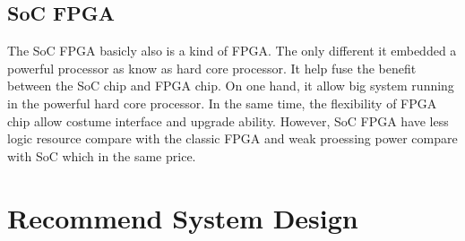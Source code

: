 \documentclass[12pt,article]{memoir}
\begin{document}
\section{SoC FPGA}
The SoC FPGA basicly also is a kind of FPGA. The only different it embedded a powerful processor as know as hard core processor. It help fuse the benefit between the SoC chip and FPGA chip. On one hand, it allow big system running in the powerful hard core processor. In the same time, the flexibility of FPGA chip allow costume interface and upgrade ability. However, SoC FPGA have less logic resource compare with the classic FPGA and weak proessing power compare with SoC which in the same price.
\newpage
\chapter{Recommend System Design}
\end{document}
